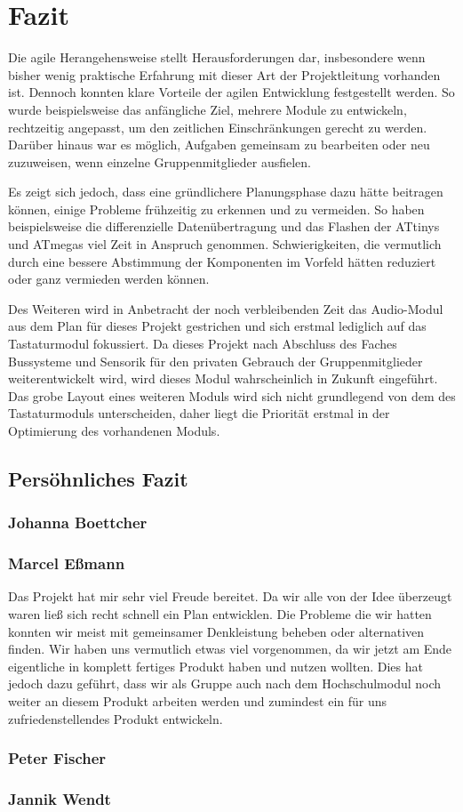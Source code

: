 \section{Fazit}
Die agile Herangehensweise stellt  Herausforderungen dar, insbesondere wenn bisher wenig praktische Erfahrung mit dieser Art der Projektleitung vorhanden ist. Dennoch konnten klare Vorteile der agilen Entwicklung festgestellt werden. So wurde beispielsweise das anfängliche Ziel, mehrere Module zu entwickeln, rechtzeitig angepasst, um den zeitlichen Einschränkungen gerecht zu werden. Darüber hinaus war es möglich, Aufgaben gemeinsam zu bearbeiten oder neu zuzuweisen, wenn einzelne Gruppenmitglieder ausfielen.

Es zeigt sich jedoch, dass eine gründlichere Planungsphase dazu hätte beitragen können, einige Probleme frühzeitig zu erkennen und zu vermeiden. So haben beispielsweise die differenzielle Datenübertragung und das Flashen der ATtinys und ATmegas viel Zeit in Anspruch genommen. Schwierigkeiten, die vermutlich durch eine bessere Abstimmung der Komponenten im Vorfeld hätten reduziert oder ganz vermieden werden können.

Des Weiteren wird in Anbetracht der noch verbleibenden Zeit das Audio-Modul aus dem Plan für dieses Projekt gestrichen und sich erstmal lediglich auf das Tastaturmodul fokussiert. Da dieses Projekt nach Abschluss des Faches \glqq Bussysteme und Sensorik\grqq{} für den privaten Gebrauch der Gruppenmitglieder weiterentwickelt wird, wird dieses Modul wahrscheinlich in Zukunft eingeführt. Das grobe Layout eines weiteren Moduls wird sich nicht grundlegend von dem des Tastaturmoduls unterscheiden, daher liegt die Priorität erstmal in der Optimierung des vorhandenen Moduls.


\subsection{Persöhnliches Fazit}
\subsubsection{Johanna Boettcher}

\subsubsection{Marcel Eßmann}
Das Projekt hat mir sehr viel Freude bereitet. Da wir alle von der Idee überzeugt waren ließ sich recht schnell ein Plan entwicklen. Die Probleme die wir hatten konnten wir meist mit gemeinsamer Denkleistung beheben oder alternativen finden.
Wir haben uns vermutlich etwas viel vorgenommen, da wir jetzt am Ende eigentliche in komplett fertiges Produkt haben und nutzen wollten. Dies hat jedoch dazu geführt, dass wir als Gruppe auch nach dem Hochschulmodul noch weiter an diesem Produkt arbeiten werden und zumindest ein für uns zufriedenstellendes Produkt entwickeln. 

\subsubsection{Peter Fischer}

\subsubsection{Jannik Wendt}